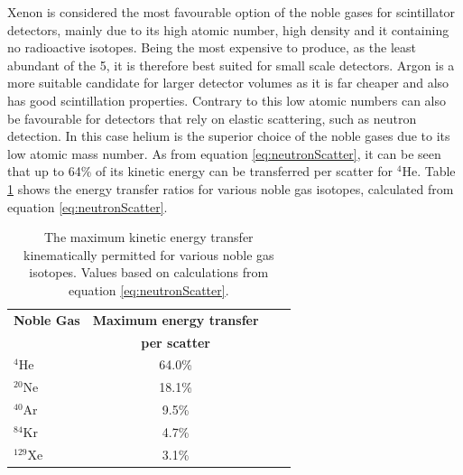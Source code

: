 Xenon is considered the most favourable option of the noble gases for scintillator detectors, mainly due to its high atomic number, high density and it containing no radioactive isotopes. Being the most expensive to produce, as the least abundant of the 5, it is therefore best suited for small scale detectors. Argon is a more suitable candidate for larger detector volumes as it is far cheaper and also has good scintillation properties. Contrary to this low atomic numbers can also be favourable for detectors that rely on elastic scattering, such as neutron detection. In this case helium is the superior choice of the noble gases due to its low atomic mass number. As from equation \ref{eq:neutronScatter}, it can be seen that up to 64\% of its kinetic energy can be transferred per scatter for $^{4}$He. Table \ref{tab:elasticScatterNobleGases} shows the energy transfer ratios for various noble gas isotopes, calculated from equation \ref{eq:neutronScatter}.
\begin{table}[htbp]
\begin{center}
  \begin{tabular}{l*{2}{c}r}
  \hline
  \textbf{Noble Gas} & \textbf{Maximum energy transfer} \\
  & \textbf{per scatter}\\
  \hline
  $^{4}$He & 64.0\%\\
  $^{20}$Ne & 18.1\%\\
  $^{40}$Ar & 9.5\%\\
  $^{84}$Kr & 4.7\%\\
  $^{129}$Xe & 3.1\%\\
  \hline
  \end{tabular}
      \caption{The maximum kinetic energy transfer kinematically permitted for various noble gas isotopes. Values based on calculations from equation \ref{eq:neutronScatter}.}
    \label{tab:elasticScatterNobleGases}
\end{center}
    \end{table}
    


